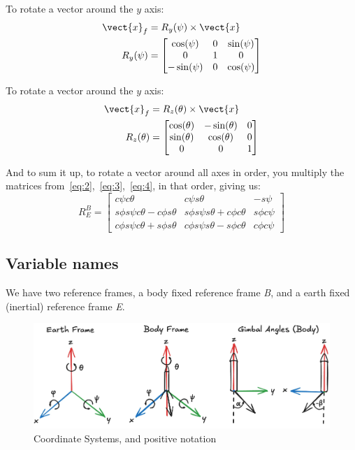 \documentclass{article}
\begin{document}
To rotate a vector around the ${y}$ axis:
\begin{equation} \label{eq:3}
\begin{split}
\vect{x}_f &= R_y(\psi) \times \vect{x} \\
R_y(\psi) &= \begin{bmatrix}
\cos(\psi) & 0 & \sin(\psi) \\
0 & 1 & 0 \\
-\sin(\psi) & 0 & \cos(\psi)
\end{bmatrix}
\end{split}
\end{equation}

To rotate a vector around the ${y}$ axis:
\begin{equation} \label{eq:4}
\begin{split}
\vect{x}_f &= R_z(\theta) \times \vect{x} \\
R_z(\theta) &= \begin{bmatrix}
\cos(\theta) & -\sin(\theta) & 0 \\
\sin(\theta) & \cos(\theta) & 0 \\
0 & 0 & 1
\end{bmatrix}
\end{split}
\end{equation}




And to sum it up, to rotate a vector around all axes in order, you multiply the matrices from{~}\ref{eq:2},{~}\ref{eq:3},{~}\ref{eq:4}, in that order, giving us:
\begin{equation} \label{eq:5}
    R^B_E = \begin{bmatrix}
        c\psi c\theta & c\psi s\theta  & -s\psi \\ 
        s\phi s\psi c\theta - c\phi s\theta & s\phi s\psi s\theta + c\phi c\theta & s\phi c\psi \\
        c\phi s\psi c\theta + s\phi s\theta & c\phi s\psi s\theta - s\phi c\theta & c\phi c\psi
    \end{bmatrix}
\end{equation}


\subsection{Variable names}
 We have two reference frames, a body fixed reference frame \textit{B}, and a earth fixed (inertial) reference frame \textit{E}. 

\begin{figure}[H]
\caption{Coordinate Systems, and positive notation}
\includegraphics[width=\textwidth]{notation}
\centering
\end{figure}
\end{document}

